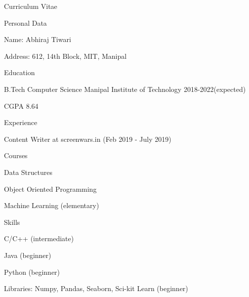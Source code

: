 \documentclass{article}
\begin{document}
	\begin{cv}{Curriculum Vitae}                                                          
		
		\begin{cvlist}{Personal Data}
			\item Name: Abhiraj Tiwari
			\item Address: 612, 14th Block, MIT, Manipal 
		\end{cvlist}
		
		\begin{cvlist}{Education}
			\item B.Tech Computer Science 	Manipal Institute of Technology 2018-2022(expected)
			\item 	CGPA 8.64
		\end{cvlist}
		
		\begin{cvlist}{Experience}
			\item Content Writer at screenwars.in (Feb 2019 - July 2019)
		\end{cvlist}
	
		\begin{cvlist}{Courses}
			\item Data Structures
			\item Object Oriented Programming
			\item Machine Learning (elementary)
		\end{cvlist}
	
	\begin{cvlist}{Skills}
		\item C/C++ (intermediate)
		\item Java (beginner)
		\item Python (beginner)
		\item Libraries: Numpy, Pandas, Seaborn, Sci-kit Learn (beginner)
	\end{cvlist}

	\end{cv}
\end{document}
